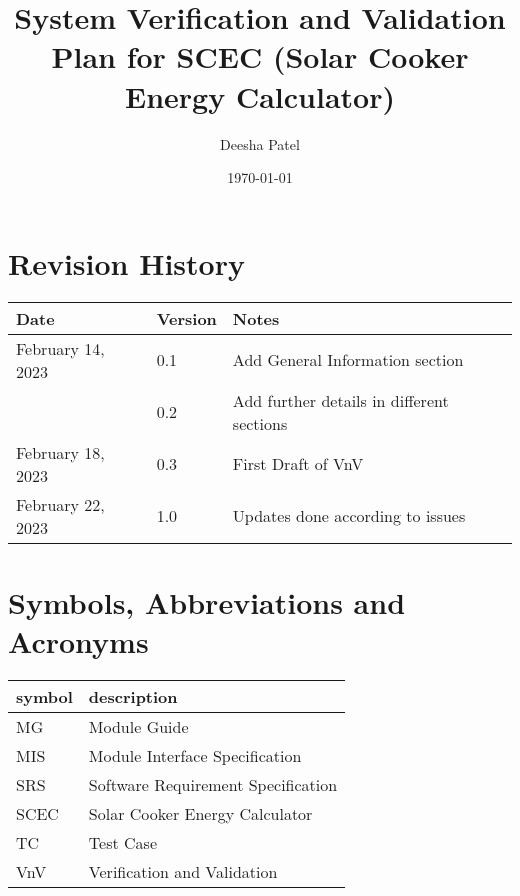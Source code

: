 \documentclass[12pt, titlepage]{article}
\begin{document}
\title{System Verification and Validation Plan for SCEC (Solar Cooker Energy Calculator)}
\author{Deesha Patel}
\date{\today}
	
\maketitle


\section{Revision History}

\begin{tabularx}{\textwidth}{p{5cm}p{1.5cm}X}
\toprule {\bf Date} & {\bf Version} & {\bf Notes}\\
\midrule
February 14, 2023 & 0.1 & Add General Information section \\
& 0.2 & Add further details in different sections \\

February 18, 2023 & 0.3 & First Draft of VnV \\
February 22, 2023 & 1.0 & Updates done according to issues \\
\bottomrule
\end{tabularx}

\newpage

\tableofcontents

\listoftables


\newpage

\section{Symbols, Abbreviations and Acronyms}

\renewcommand{\arraystretch}{1.2}
\begin{tabular}{l l} 
  \toprule		
  \textbf{symbol} & \textbf{description}\\
  \midrule 
  MG & Module Guide \\
  MIS & Module Interface Specification \\
  SRS & Software Requirement Specification\\
  SCEC & Solar Cooker Energy Calculator \\ 
  TC & Test Case \\
  VnV & Verification and Validation \\ 
  
  \bottomrule
\end{tabular}\\
\end{document}
